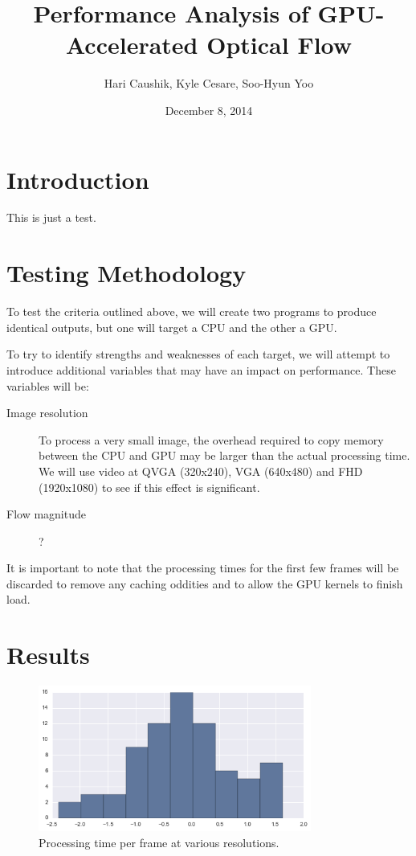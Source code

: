 \documentclass{article}
\title{Performance Analysis of GPU-Accelerated Optical Flow}
\date{December 8, 2014}
\author{Hari Caushik, Kyle Cesare, Soo-Hyun Yoo}
\begin{document}
\maketitle

\newpage

\tableofcontents

\newpage

\section{Introduction}
This is just a test.

\section{Testing Methodology}
To test the criteria outlined above, we will create two programs to produce
identical outputs, but one will target a CPU and the other a GPU.

To try to identify strengths and weaknesses of each target, we will attempt to
introduce additional variables that may have an impact on performance. These
variables will be:

\begin{description}
  \item[Image resolution] To process a very small image, the overhead required
    to copy memory between the CPU and GPU may be larger than the actual
    processing time. We will use video at QVGA (320x240), VGA (640x480) and FHD
    (1920x1080) to see if this effect is significant.
  \item[Flow magnitude] ?
\end{description}

It is important to note that the processing times for the first few frames will
be discarded to remove any caching oddities and to allow the GPU kernels to
finish load.

\section{Results}

\begin{figure}[H]
  \centering
    \includegraphics[width=0.8\textwidth]{test_resolution.png}
  \caption{Processing time per frame at various resolutions.}
\end{figure}
\end{document}
